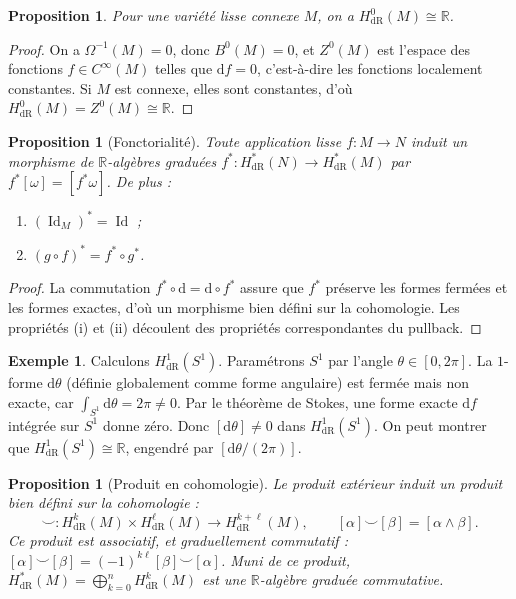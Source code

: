 \documentclass[12pt,a4paper,openany]{book}
\theoremstyle{definition}
\newtheorem{exemple}[definition]{Exemple}
\theoremstyle{plain}
\newtheorem{proposition}[definition]{Proposition}
\theoremstyle{remark}
\newcommand{\R}{\mathbb{R}}
\DeclareMathOperator{\Id}{Id}
\newcommand{\dd}{\mathrm{d}}
\begin{document}
\begin{proposition}\label{prop:H0}
Pour une variété lisse connexe $M$, on a $H^0_{\mathrm{dR}}(M) \cong \R$.
\end{proposition}

\begin{proof}
On a $\Omega^{-1}(M) = 0$, donc $B^0(M) = 0$, et $Z^0(M)$ est l'espace
des fonctions $f \in C^\infty(M)$ telles que $\dd f = 0$, c'est-à-dire les
fonctions localement constantes. Si $M$ est connexe, elles sont constantes,
d'où $H^0_{\mathrm{dR}}(M) = Z^0(M) \cong \R$.
\end{proof}

\begin{proposition}[Fonctorialité]\label{prop:fonctorialite-cohomologie}
Toute application lisse $f \colon M \to N$ induit un morphisme de $\R$-algèbres
graduées $f^* \colon H^*_{\mathrm{dR}}(N) \to H^*_{\mathrm{dR}}(M)$ par
$f^*[\omega] = [f^*\omega]$. De plus :
\begin{enumerate}[label=(\roman*)]
  \item $(\Id_M)^* = \Id$ ;
  \item $(g \circ f)^* = f^* \circ g^*$.
\end{enumerate}
\end{proposition}

\begin{proof}
La commutation $f^* \circ \dd = \dd \circ f^*$ assure que $f^*$ préserve les
formes fermées et les formes exactes, d'où un morphisme bien défini sur la
cohomologie. Les propriétés (i) et (ii) découlent des propriétés
correspondantes du pullback.
\end{proof}

\begin{exemple}\label{ex:H1-S1}
Calculons $H^1_{\mathrm{dR}}(S^1)$. Paramétrons $S^1$ par l'angle
$\theta \in [0, 2\pi]$. La $1$-forme $\dd\theta$ (définie globalement comme
forme angulaire) est fermée mais non exacte, car $\int_{S^1} \dd\theta = 2\pi
\neq 0$. Par le théorème de Stokes, une forme exacte $\dd f$ intégrée sur
$S^1$ donne zéro. Donc $[\dd\theta] \neq 0$ dans $H^1_{\mathrm{dR}}(S^1)$.
On peut montrer que $H^1_{\mathrm{dR}}(S^1) \cong \R$, engendré par
$[\dd\theta/(2\pi)]$.
\end{exemple}

\begin{proposition}[Produit en cohomologie]\label{prop:cup-product}
Le produit extérieur induit un produit bien défini sur la cohomologie :
\[
  \smile \colon H^k_{\mathrm{dR}}(M) \times H^\ell_{\mathrm{dR}}(M)
  \to H^{k+\ell}_{\mathrm{dR}}(M), \qquad
  [\alpha] \smile [\beta] = [\alpha \wedge \beta].
\]
Ce produit est associatif, et graduellement commutatif :
$[\alpha] \smile [\beta] = (-1)^{k\ell} [\beta] \smile [\alpha]$.
Muni de ce produit, $H^*_{\mathrm{dR}}(M) = \bigoplus_{k=0}^n
H^k_{\mathrm{dR}}(M)$ est une $\R$-algèbre graduée commutative.
\end{proposition}
\end{document}
